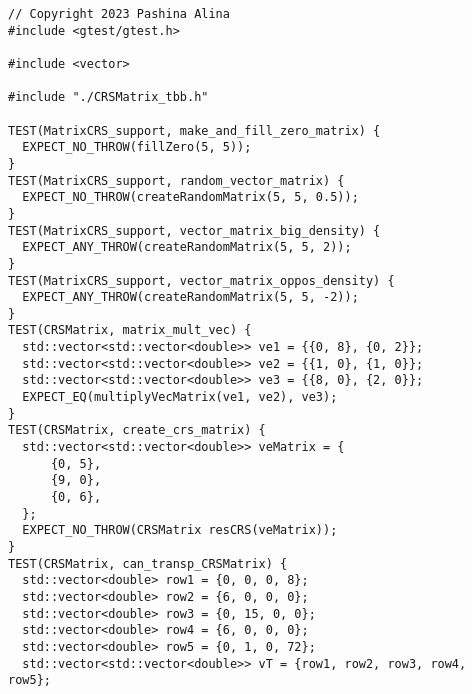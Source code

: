 \documentclass[14pt, russian]{extarticle}
\begin{document}
	\begin{lstlisting}
// Copyright 2023 Pashina Alina
#include <gtest/gtest.h>

#include <vector>

#include "./CRSMatrix_tbb.h"

TEST(MatrixCRS_support, make_and_fill_zero_matrix) {
  EXPECT_NO_THROW(fillZero(5, 5));
}
TEST(MatrixCRS_support, random_vector_matrix) {
  EXPECT_NO_THROW(createRandomMatrix(5, 5, 0.5));
}
TEST(MatrixCRS_support, vector_matrix_big_density) {
  EXPECT_ANY_THROW(createRandomMatrix(5, 5, 2));
}
TEST(MatrixCRS_support, vector_matrix_oppos_density) {
  EXPECT_ANY_THROW(createRandomMatrix(5, 5, -2));
}
TEST(CRSMatrix, matrix_mult_vec) {
  std::vector<std::vector<double>> ve1 = {{0, 8}, {0, 2}};
  std::vector<std::vector<double>> ve2 = {{1, 0}, {1, 0}};
  std::vector<std::vector<double>> ve3 = {{8, 0}, {2, 0}};
  EXPECT_EQ(multiplyVecMatrix(ve1, ve2), ve3);
}
TEST(CRSMatrix, create_crs_matrix) {
  std::vector<std::vector<double>> veMatrix = {
      {0, 5},
      {9, 0},
      {0, 6},
  };
  EXPECT_NO_THROW(CRSMatrix resCRS(veMatrix));
}
TEST(CRSMatrix, can_transp_CRSMatrix) {
  std::vector<double> row1 = {0, 0, 0, 8};
  std::vector<double> row2 = {6, 0, 0, 0};
  std::vector<double> row3 = {0, 15, 0, 0};
  std::vector<double> row4 = {6, 0, 0, 0};
  std::vector<double> row5 = {0, 1, 0, 72};
  std::vector<std::vector<double>> vT = {row1, row2, row3, row4, row5};


\end{lstlisting}
\end{document}
